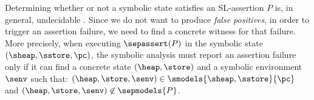 {\small {}}
\hspace{-3pt}Determining whether or not a symbolic state satisfies an SL-assertion $P$ is, in general, 
undecidable \cite{citemeplease}. Since we do not want to produce \emph{false positives}, in order to trigger 
an assertion failure, we need to find a concrete witness for that failure. More precisely, when executing 
$\sepassert(P)$ in the symbolic state $(\sheap, \sstore, \pc)$, the symbolic analysis must  
report an assertion failure only if it can find a concrete state $(\heap, \store)$  and a symbolic environment 
$\senv$ such that: 
$(\heap, \store, \senv) \in \smodels{\sheap, \sstore}{\pc}$ and
$(\heap, \store, \senv) \not\in \sepmodels{P}$.

